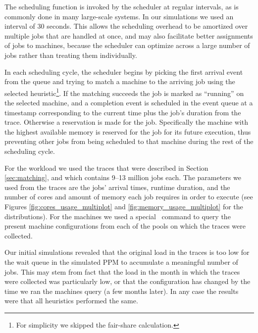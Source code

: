 The scheduling function is invoked by the scheduler at regular
intervals, as is commonly done in many large-scale systems.
In our simulations we used an interval of 30 seconds.
This allows the scheduling overhead to be amortized over multiple jobs
that are handled at once, 
and may also facilitate better assignments of jobs to machines, because
the scheduler can optimize across a large number of jobs rather than
treating them individually.

In each scheduling cycle, the scheduler begins by picking the first
arrival event from the queue and trying to match a machine to the
arriving job using the selected heuristic\footnote{For simplicity we skipped the fair-share calculation.}.
If the matching succeeds the job is marked as ``running'' on the
selected machine, and a completion event is scheduled in the event
queue at a timestamp corresponding to the current time plus the job's
duration from the trace.
Otherwise a reservation is made for the job.
Specifically the machine with the highest available memory is reserved
for the job for its future execution, thus preventing other jobs from
being scheduled to that machine during the rest of the scheduling cycle. 


For the workload we used the traces that were described in Section
\ref{sec:matching}, and which contains 9--13 million jobs each.
The parameters we used from the traces are the jobs' arrival times,
runtime duration, and the number of cores and amount of memory each
job requires in order to execute (see Figures
\ref{fig:cores_usage_multiplot} and \ref{fig:memory_usage_multiplot}
for the distributions).
For the machines we used a special \nb\ command to query the present
machine configurations from each of the pools on which the traces were
collected.

Our initial simulations revealed that
the original load in the traces is too low for the wait queue in the
simulated PPM to accumulate a meaningful number of jobs.
This may stem from fact that the load in the month in which the traces
were collected was particularly low, or that the configuration
has changed by the time we ran the machines query (a few months later). 
In any case the results were that all heuristics performed the same. 

